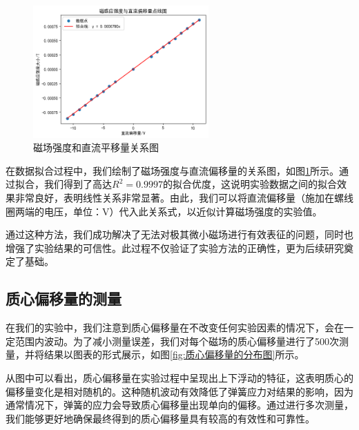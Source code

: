 \documentclass[12pt]{ctexart}
\numberwithin{equation}{section} %
\begin{document}

\begin{figure}[H] %
    \centering %
    \includegraphics[width=0.6\textwidth]{磁场强度与直流偏移量的关系.png} %
    \caption{磁场强度和直流平移量关系图} %
    \label{fig:磁场强度和直流平移量关系图} %
\end{figure}

在数据拟合过程中，我们绘制了磁场强度与直流偏移量的关系图，如图\ref{fig:磁场强度和直流平移量关系图}所示。通过拟合，我们得到了高达$R^2 = 0.9997$的拟合优度，这说明实验数据之间的拟合效果非常良好，表明线性关系非常显著。由此，我们可以将直流偏移量（施加在螺线圈两端的电压，单位：V）代入此关系式，以近似计算磁场强度的实验值。

通过这种方法，我们成功解决了无法对极其微小磁场进行有效表征的问题，同时也增强了实验结果的可信性。此过程不仅验证了实验方法的正确性，更为后续研究奠定了基础。

\subsection{质心偏移量的测量}
在我们的实验中，我们注意到质心偏移量在不改变任何实验因素的情况下，会在一定范围内波动。为了减小测量误差，我们对每个磁场的质心偏移量进行了500次测量，并将结果以图表的形式展示，如图\ref{fig:质心偏移量的分布图}所示。

从图中可以看出，质心偏移量在实验过程中呈现出上下浮动的特征，这表明质心的偏移量变化是相对随机的。这种随机波动有效降低了弹簧应力对结果的影响，因为通常情况下，弹簧的应力会导致质心偏移量出现单向的偏移。通过进行多次测量，我们能够更好地确保最终得到的质心偏移量具有较高的有效性和可靠性。
\end{document}
